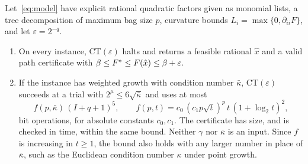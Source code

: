 \begin{theorem}\label{thm:approx}
Let~\eqref{eq:model} have explicit rational quadratic factors given as
monomial lists, a tree decomposition of maximum bag size $p$, curvature bounds
$L_i=\max\{0,\partial_{ii}F\}$, and let $\varepsilon=2^{-q}$.
\begin{enumerate}[label=(\alph*)]
\item On every instance, CT$(\varepsilon)$ halts and returns a feasible
rational $\hat x$ and a valid path certificate with
$\beta\le F^{*}\le F(\hat x)\le\beta+\varepsilon$.
\item If the instance has weighted growth with condition number $\bar\kappa$,
CT$(\varepsilon)$ succeeds at a trial with $2^\mu\le6\sqrt{\bar\kappa}$ and
uses at most
\[
f(p,\bar\kappa)\,(I+q+1)^5,\qquad
f(p,t)=c_0\,(c_1p\sqrt t)^p\,t\,(1+\log_2t)^2,
\]
bit operations, for absolute constants $c_0,c_1$. The certificate has size,
and is checked in time, within the same bound. Neither $\gamma$ nor
$\bar\kappa$ is an input. Since $f$ is increasing in $t\ge1$, the bound also
holds with any larger number in place of $\bar\kappa$, such as the Euclidean
condition number $\kappa$ under point growth.
\end{enumerate}
\end{theorem}

